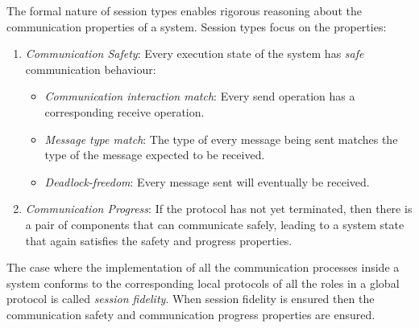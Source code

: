 
The formal nature of session types enables rigorous
reasoning about the communication properties of a system.
Session types %
focus on the %
properties:
%
\begin{enumerate}[label=$\bullet$]
	\item	{\em Communication Safety}: Every execution state of the system has {\em safe} communication behaviour:
	\begin{itemize}
		\item	{\em Communication interaction match}:
				Every send
				operation has a corresponding receive
				operation.
		\item	{\em Message type match}:
				The type of every message being sent matches the type of the message expected to be received.
		\item	{\em Deadlock-freedom}:
				Every message sent will eventually be received.
	\end{itemize}

	\item	{\em Communication Progress}: If the protocol has not yet terminated, then there is a pair of components that can communicate safely, leading to a system state that again satisfies the safety and progress properties.
\end{enumerate}
%
%
The case where the implementation of all the communication
processes inside a system conforms to the corresponding
local protocols of all the roles in a global protocol
is called {\em session fidelity}.
When session fidelity is ensured then the communication safety
and communication progress properties are ensured.

